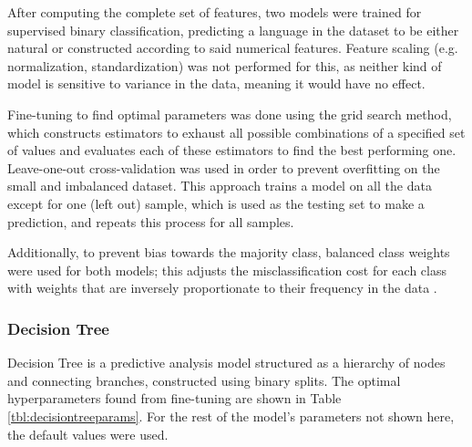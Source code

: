 \documentclass[12pt,a4paper]{article}
\numberwithin{figure}{section}
\numberwithin{table}{section}
\numberwithin{definition}{section}
\begin{document}

After computing the complete set of features, two models were trained for supervised binary classification, predicting a language in the dataset to be either natural or constructed according to said numerical features. Feature scaling (e.g. normalization, standardization) was not performed for this, as neither kind of model is sensitive to variance in the data, meaning it would have no effect.

Fine-tuning to find optimal parameters was done using the grid search method, which constructs estimators to exhaust all possible combinations of a specified set of values and evaluates each of these estimators to find the best performing one. Leave-one-out cross-validation was used in order to prevent overfitting on the small and imbalanced dataset. This approach trains a model on all the data except for one (left out) sample, which is used as the testing set to make a prediction, and repeats this process for all samples. 

Additionally, to prevent bias towards the majority class, balanced class weights were used for both models; this adjusts the misclassification cost for each class with weights that are inversely proportionate to their frequency in the data \parencite{Han2021article}. 

\subsubsection{Decision Tree}
\label{ssec:decisiontree}


Decision Tree is a predictive analysis model structured as a hierarchy of nodes and connecting branches, constructed using binary splits. The optimal hyperparameters found from fine-tuning are shown in Table \ref{tbl:decisiontreeparams}. For the rest of the model's parameters not shown here, the default values were used.
\end{document}
